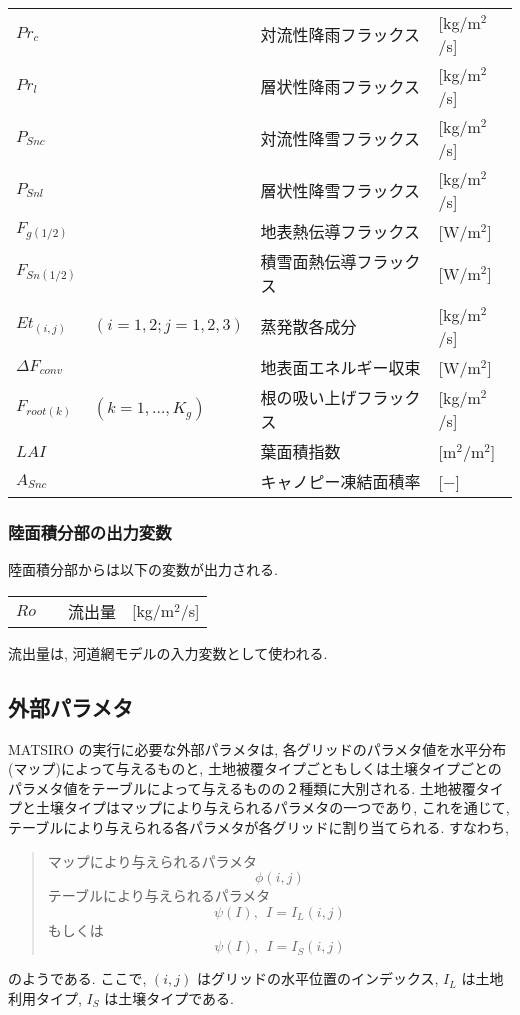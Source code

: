 \begin{tabular}{llll}
$Pr_{c}$       &                     & 対流性降雨フラックス & [kg/m$^2$/s] \\
$Pr_{l}$       &                     & 層状性降雨フラックス & [kg/m$^2$/s] \\
$P_{Snc}$      &                     & 対流性降雪フラックス & [kg/m$^2$/s] \\
$P_{Snl}$      &                     & 層状性降雪フラックス & [kg/m$^2$/s] \\
$F_{g(1/2)}$      &                     & 地表熱伝導フラックス & [W/m$^2$] \\
$F_{Sn(1/2)}$     &                     & 積雪面熱伝導フラックス & [W/m$^2$] \\
$Et_{(i,j)}$   & $(i=1,2;j=1,2,3)$   & 蒸発散各成分   & [kg/m$^2$/s] \\
$\Delta F_{conv}$&                     & 地表面エネルギー収束 & [W/m$^2$] \\
$F_{root(k)}$      & $(k=1,\ldots,K_g)$  & 根の吸い上げフラックス & [kg/m$^2$/s] \\
$LAI$          &                     & 葉面積指数 & [m$^2$/m$^2$] \\
$A_{Snc}$     &                     & キャノピー凍結面積率 & [$-$] \\
\end{tabular}
\medskip

\subsubsection{陸面積分部の出力変数}

陸面積分部からは以下の変数が出力される.

\begin{tabular}{llll}
$Ro$           &                     & 流出量             & [kg/m$^2$/s] \\
\end{tabular}
\medskip

流出量は, 河道網モデルの入力変数として使われる.

\subsection{外部パラメタ}

MATSIRO の実行に必要な外部パラメタは, 各グリッドのパラメタ値を水平分布
(マップ)によって与えるものと, 土地被覆タイプごともしくは土壌タイプごとの
パラメタ値をテーブルによって与えるものの２種類に大別される. 土地被覆タイ
プと土壌タイプはマップにより与えられるパラメタの一つであり, これを通じて,
テーブルにより与えられる各パラメタが各グリッドに割り当てられる. すなわち,
\begin{quote}
 マップにより与えられるパラメタ
 \[
 \phi(i,j)
 \]
 テーブルにより与えられるパラメタ
 \[
 \psi(I), \ \ I = I_L(i,j)
 \]
もしくは
 \[
 \psi(I), \ \ I = I_S(i,j)
 \]
\end{quote}
のようである. ここで, $(i,j)$ はグリッドの水平位置のインデックス, $I_L$
は土地利用タイプ, $I_S$ は土壌タイプである.

